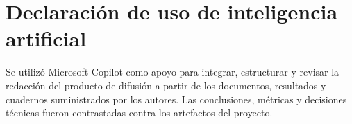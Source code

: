 \documentclass[letterpaper,11pt]{article}
\begin{document}
\section*{Declaración de uso de inteligencia artificial} 

Se utilizó Microsoft Copilot como apoyo para integrar, estructurar y revisar la redacción del producto de difusión a partir de los documentos, resultados y cuadernos suministrados por los autores. Las conclusiones, métricas y decisiones técnicas fueron contrastadas contra los artefactos del proyecto. 

\printbibliography[title={Referencias}]

\clearpage 
\appendix
\end{document}
